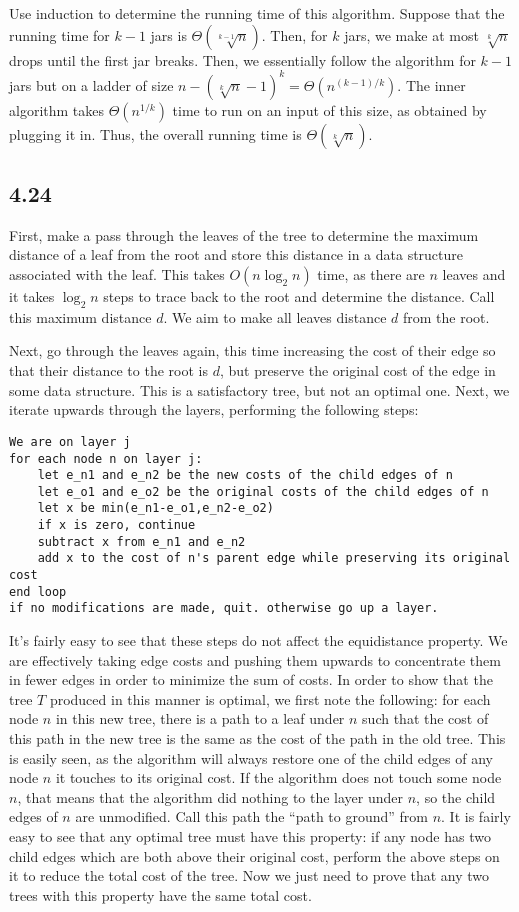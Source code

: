 \documentclass{article}
\begin{document}
Use induction to determine the running time of this algorithm. Suppose that the running time for $k-1$ jars is $\Theta(\sqrt[k-1]{n})$. Then, for $k$ jars, we make at most $\sqrt[k]{n}$ drops until the first jar breaks. Then, we essentially follow the algorithm for $k-1$ jars but on a ladder of size $n-(\sqrt[k]{n}-1)^k=\Theta(n^{(k-1)/k})$. The inner algorithm takes $\Theta(n^{1/k})$ time to run on an input of this size, as obtained by plugging it in. Thus, the overall running time is $\Theta(\sqrt[k]{n})$.

\subsection*{4.24}
First, make a pass through the leaves of the tree to determine the maximum distance of a leaf from the root and store this distance in a data structure associated with the leaf. This takes $O(n\log_2n)$ time, as there are $n$ leaves and it takes $\log_2n$ steps to trace back to the root and determine the distance. Call this maximum distance $d$. We aim to make all leaves distance $d$ from the root. 

Next, go through the leaves again, this time increasing the cost of their edge so that their distance to the root is $d$, but preserve the original cost of the edge in some data structure. This is a satisfactory tree, but not an optimal one. Next, we iterate upwards through the layers, performing the following steps:

\begin{verbatim}
We are on layer j
for each node n on layer j:
    let e_n1 and e_n2 be the new costs of the child edges of n
    let e_o1 and e_o2 be the original costs of the child edges of n
    let x be min(e_n1-e_o1,e_n2-e_o2)
    if x is zero, continue
    subtract x from e_n1 and e_n2
    add x to the cost of n's parent edge while preserving its original cost
end loop
if no modifications are made, quit. otherwise go up a layer.
\end{verbatim}

It's fairly easy to see that these steps do not affect the equidistance property. We are effectively taking edge costs and pushing them upwards to concentrate them in fewer edges in order to minimize the sum of costs. In order to show that the tree $T$ produced in this manner is optimal, we first note the following: for each node $n$ in this new tree, there is a path to a leaf under $n$ such that the cost of this path in the new tree is the same as the cost of the path in the old tree. This is easily seen, as the algorithm will always restore one of the child edges of any node $n$ it touches to its original cost. If the algorithm does not touch some node $n$, that means that the algorithm did nothing to the layer under $n$, so the child edges of $n$ are unmodified. Call this path the ``path to ground'' from $n$. It is fairly easy to see that any optimal tree must have this property: if any node has two child edges which are both above their original cost, perform the above steps on it to reduce the total cost of the tree. Now we just need to prove that any two trees with this property have the same total cost.
\end{document}
